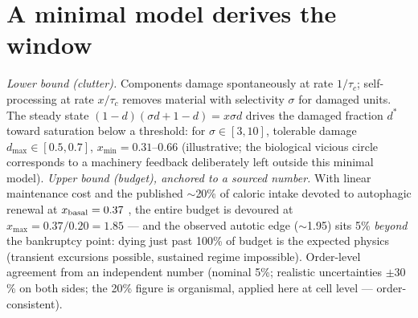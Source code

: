 \documentclass[11pt]{article}
\begin{document}
\section{A minimal model derives the window}
\emph{Lower bound (clutter).} Components damage spontaneously at rate $1/\tau_c$;
self-processing at rate $x/\tau_c$ removes material with selectivity $\sigma$ for damaged units.
The steady state $(1-d)(\sigma d + 1 - d) = x\sigma d$ drives the damaged fraction $d^*$ toward
saturation below a threshold: for $\sigma \in [3,10]$, tolerable damage $d_{\max} \in [0.5,0.7]$,
$x_{\min} = 0.31$--$0.66$ (illustrative; the biological vicious circle corresponds to a
machinery feedback deliberately left outside this minimal model). \emph{Upper bound (budget),
anchored to a sourced number.} With linear maintenance cost and the published $\sim$20\% of
caloric intake devoted to autophagic renewal at $x_{\rm basal} = 0.37$ \cite{PMC636}, the entire
budget is devoured at $x_{\max} = 0.37/0.20 = 1.85$ --- and the observed autotic edge
($\sim$1.95) sits 5\% \emph{beyond} the bankruptcy point: dying just past 100\% of budget is
the expected physics (transient excursions possible, sustained regime impossible). Order-level
agreement from an independent number (nominal 5\%; realistic uncertainties $\pm 30$\% on both
sides; the 20\% figure is organismal, applied here at cell level --- order-consistent).
\end{document}
